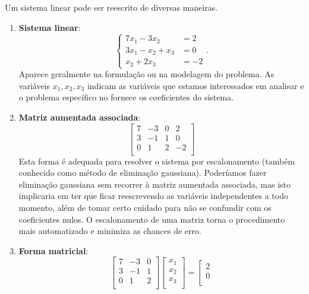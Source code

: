 Um sistema linear pode ser reescrito de diversas maneiras.
\begin{enumerate}[1.]
	\item \textbf{Sistema linear}:
	\begin{equation}
	\left\{
	\begin{array}{rl}
	7x_1 - 3x_2 & = 2 \\
	3x_1 - x_2 + x_3 & = 0 \\
	x_2 + 2x_3 & = -2
	\end{array}
	\right..
	\end{equation} Aparece geralmente na formulação ou na modelagem do problema. As variáveis $x_1, x_2, x_3$ indicam as variáveis que estamos interessados em analisar e o problema específico no fornece os coeficientes do sistema.
	\item \textbf{Matriz aumentada associada}:
	\begin{equation}
	\left[
	\begin{array}{ccc|c}
	7 & -3 & 0 & 2 \\
	3 & -1 & 1 & 0 \\
	0 & 1 & 2 & -2 \\
	\end{array}
	\right]
	\end{equation} Esta forma é adequada para resolver o sistema por escalonamento (também conhecido como método de eliminação gaussiana). Poderíamos fazer eliminação gaussiana sem recorrer à matriz aumentada associada, mas isto implicaria em ter que ficar reescrevendo as variáveis independentes a todo momento, além de tomar certo cuidado para não se confundir com os coeficientes nulos. O escalonamento de uma matriz torna o procedimento mais automatizado e minimiza as chances de erro.
	\item  \textbf{Forma matricial}:
	\begin{equation}
	\left[
	\begin{array}{ccc}
	7 & -3 & 0  \\
	3 & -1 & 1  \\
	0 & 1 & 2  \\
	\end{array}
	\right]
	\left[
	\begin{array}{c}
	x_1   \\
	x_2   \\
	x_3   \\
	\end{array}
	\right] =
	\left[
	\begin{array}{c}
	2   \\
	0   \\

\end{array}
\end{equation}
\end{enumerate}
